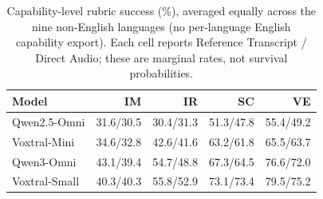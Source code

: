 \begin{table}[htbp]
\centering
\caption{Capability-level rubric success (\%), averaged equally across the nine non-English languages (no per-language English capability export). Each cell reports Reference Transcript / Direct Audio; these are marginal rates, not survival probabilities.}
\label{tab:open_capabilities}
\begingroup
\fontsize{8.5}{10.2}\selectfont
\setlength{\tabcolsep}{1pt}
\renewcommand{\arraystretch}{1.06}
\begin{tabular*}{\linewidth}{@{}l@{\extracolsep{\fill}}rrrr@{}}
\toprule
\textbf{Model} & \textbf{IM} & \textbf{IR} & \textbf{SC} & \textbf{VE} \\
\midrule
Qwen2.5-Omni & 31.6/30.5 & 30.4/31.3 & 51.3/47.8 & 55.4/49.2 \\
Voxtral-Mini & 34.6/32.8 & 42.6/41.6 & 63.2/61.8 & 65.5/63.7 \\
Qwen3-Omni & 43.1/39.4 & 54.7/48.8 & 67.3/64.5 & 76.6/72.0 \\
Voxtral-Small & 40.3/40.3 & 55.8/52.9 & 73.1/73.4 & 79.5/75.2 \\
\bottomrule
\end{tabular*}
\endgroup
\end{table}


\clearpage

